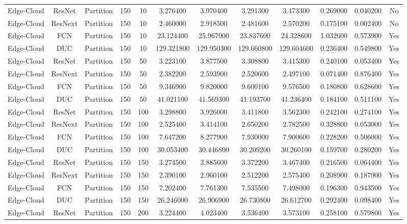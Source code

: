 \begin{tabular}{|c||c||c||c||c||c||c||c||c||c||c||c|}
Edge-Cloud & ResNet & Partition & 150 & 10 & 3.276400 & 3.970400 & 3.291300 & 3.473300 & 0.269000 & 0.040200 & No \\
Edge-Cloud & ResNext & Partition & 150 & 10 & 2.460000 & 2.918500 & 2.481600 & 2.570200 & 0.175100 & 0.002400 & No \\
Edge-Cloud & FCN & Partition & 150 & 10 & 23.124400 & 25.967000 & 23.837600 & 24.328600 & 1.032600 & 0.573900 & Yes \\
Edge-Cloud & DUC & Partition & 150 & 10 & 129.321800 & 129.950300 & 129.660800 & 129.604600 & 0.236400 & 0.549800 & Yes \\
Edge-Cloud & ResNet & Partition & 150 & 50 & 3.223100 & 3.877500 & 3.308800 & 3.415300 & 0.240100 & 0.053400 & Yes \\
Edge-Cloud & ResNext & Partition & 150 & 50 & 2.382200 & 2.593900 & 2.520600 & 2.497100 & 0.071400 & 0.876400 & Yes \\
Edge-Cloud & FCN & Partition & 150 & 50 & 9.346900 & 9.820000 & 9.600100 & 9.576500 & 0.180800 & 0.628600 & Yes \\
Edge-Cloud & DUC & Partition & 150 & 50 & 41.021100 & 41.569300 & 41.193700 & 41.236400 & 0.184100 & 0.511100 & Yes \\
Edge-Cloud & ResNet & Partition & 150 & 100 & 3.298800 & 3.926000 & 3.411800 & 3.562300 & 0.242100 & 0.274100 & Yes \\
Edge-Cloud & ResNext & Partition & 150 & 100 & 2.525400 & 3.414100 & 2.650200 & 2.782500 & 0.328800 & 0.053000 & Yes \\
Edge-Cloud & FCN & Partition & 150 & 100 & 7.647200 & 8.277900 & 7.930000 & 7.900600 & 0.228200 & 0.506000 & Yes \\
Edge-Cloud & DUC & Partition & 150 & 100 & 30.053400 & 30.446800 & 30.209200 & 30.260100 & 0.159700 & 0.280200 & Yes \\
Edge-Cloud & ResNet & Partition & 150 & 150 & 3.274500 & 3.885600 & 3.372200 & 3.467400 & 0.216500 & 0.064400 & Yes \\
Edge-Cloud & ResNext & Partition & 150 & 150 & 2.390100 & 2.960100 & 2.512200 & 2.575400 & 0.208900 & 0.187900 & Yes \\
Edge-Cloud & FCN & Partition & 150 & 150 & 7.202400 & 7.761300 & 7.535500 & 7.498000 & 0.196300 & 0.943500 & Yes \\
Edge-Cloud & DUC & Partition & 150 & 150 & 26.246000 & 26.906900 & 26.730800 & 26.612700 & 0.292400 & 0.098400 & Yes \\
Edge-Cloud & ResNet & Partition & 150 & 200 & 3.224400 & 4.023400 & 3.536400 & 3.573100 & 0.258100 & 0.579800 & Yes \\

\end{tabular}
